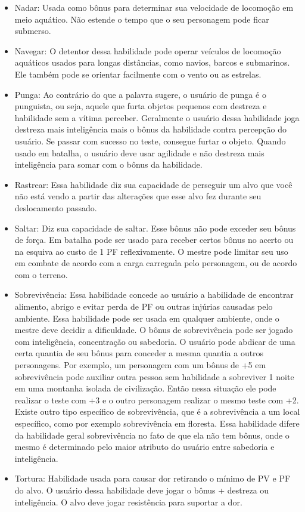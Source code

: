 \begin{itemize}
	\item Nadar: Usada como bônus para determinar sua velocidade de locomoção em meio aquático. Não estende o tempo que o seu personagem pode ficar submerso.
	
	\item Navegar: O detentor dessa habilidade pode operar veículos de locomoção aquáticos usados para longas distâncias, como navios, barcos e submarinos. Ele também pode se orientar facilmente com o vento ou as estrelas.
	
	\item Punga: Ao contrário do que a palavra sugere, o usuário de punga é o punguista, ou seja, aquele que furta objetos pequenos com destreza e habilidade sem a vítima perceber. Geralmente o usuário dessa habilidade joga destreza mais inteligência mais o bônus da habilidade contra percepção do usuário. Se passar com sucesso no teste, consegue furtar o objeto. Quando usado em batalha, o usuário deve usar agilidade e não destreza mais inteligência para somar com o bônus da habilidade.  
	
	\item Rastrear: Essa habilidade diz sua capacidade de perseguir um alvo que você não está vendo a partir das alterações que esse alvo fez durante seu deslocamento passado.
	
	\item Saltar: Diz sua capacidade de saltar. Esse bônus não pode exceder seu bônus de força. Em batalha pode ser usado para receber certos bônus no acerto ou na esquiva ao custo de 1 PF reflexivamente. O mestre pode limitar seu uso em combate de acordo com a carga carregada pelo personagem, ou de acordo com o terreno.
	
	\item Sobrevivência: Essa habilidade concede ao usuário a habilidade de encontrar alimento, abrigo e evitar perda de PF ou outras injúrias causadas pelo ambiente. Essa habilidade pode ser usada em qualquer ambiente, onde o mestre deve decidir a dificuldade. O bônus de sobrevivência pode ser jogado com inteligência, concentração ou sabedoria. O usuário pode abdicar de uma certa quantia de seu bônus para conceder a mesma quantia a outros personagens. Por exemplo, um personagem com um bônus de +5 em sobrevivência pode auxiliar outra pessoa sem habilidade a sobreviver 1 noite em uma montanha isolada de civilização. Então nessa situação ele pode realizar o teste com +3 e o outro personagem realizar o mesmo teste com +2. Existe outro tipo específico de sobrevivência, que é a sobrevivência a um local específico, como por exemplo sobrevivência em floresta. Essa habilidade difere da habilidade geral sobrevivência no fato de que ela não tem bônus, onde o mesmo é determinado pelo maior atributo do usuário entre sabedoria e inteligência.
	
	\item Tortura: Habilidade usada para causar dor retirando o mínimo de PV e PF do alvo. O usuário dessa habilidade deve jogar o bônus + destreza ou inteligência. O alvo deve jogar resistência para suportar a dor.


\end{itemize}



